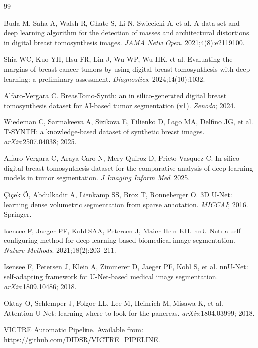 \documentclass[11pt]{article}
\begin{document}
\begin{thebibliography}{99}
\small

Buda M, Saha A, Walsh R, Ghate S, Li N, Swiecicki A, et al.
A data set and deep learning algorithm for the detection of masses and architectural
distortions in digital breast tomosynthesis images.
\emph{JAMA Netw Open}. 2021;4(8):e2119100.

Shia WC, Kuo YH, Hsu FR, Lin J, Wu WP, Wu HK, et al.
Evaluating the margins of breast cancer tumors by using digital breast tomosynthesis
with deep learning: a preliminary assessment.
\emph{Diagnostics}. 2024;14(10):1032.

Alfaro-Vergara C.
BreasTomo-Synth: an in silico-generated digital breast tomosynthesis dataset for
AI-based tumor segmentation (v1). \emph{Zenodo}; 2024.

Wiedeman C, Sarmakeeva A, Sizikova E, Filienko D, Lago MA, Delfino JG, et al.
T-SYNTH: a knowledge-based dataset of synthetic breast images.
\emph{arXiv}:2507.04038; 2025.

Alfaro Vergara C, Araya Caro N, Mery Quiroz D, Prieto Vasquez C.
In silico digital breast tomosynthesis dataset for the comparative analysis of deep
learning models in tumor segmentation.
\emph{J Imaging Inform Med}. 2025.

{\c{C}}i{\c{c}}ek {\"O}, Abdulkadir A, Lienkamp SS, Brox T, Ronneberger O.
3D U-Net: learning dense volumetric segmentation from sparse annotation.
\emph{MICCAI}; 2016. Springer.

Isensee F, Jaeger PF, Kohl SAA, Petersen J, Maier-Hein KH.
nnU-Net: a self-configuring method for deep learning-based biomedical image
segmentation. \emph{Nature Methods}. 2021;18(2):203--211.

Isensee F, Petersen J, Klein A, Zimmerer D, Jaeger PF, Kohl S, et al.
nnU-Net: self-adapting framework for U-Net-based medical image segmentation.
\emph{arXiv}:1809.10486; 2018.

Oktay O, Schlemper J, Folgoc LL, Lee M, Heinrich M, Misawa K, et al.
Attention U-Net: learning where to look for the pancreas.
\emph{arXiv}:1804.03999; 2018.

VICTRE Automatic Pipeline. Available from:
\url{https://github.com/DIDSR/VICTRE_PIPELINE}.


\end{thebibliography}
\end{document}
